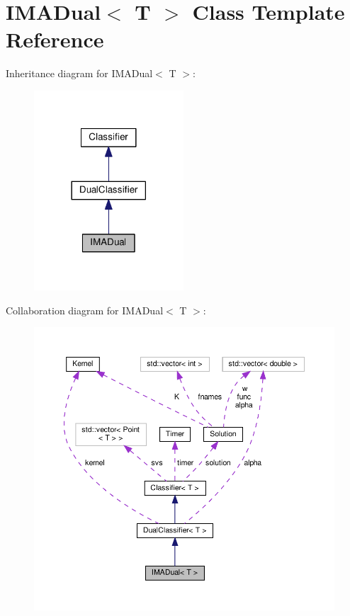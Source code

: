\hypertarget{class_i_m_a_dual}{}\section{I\+M\+A\+Dual$<$ T $>$ Class Template Reference}
\label{class_i_m_a_dual}


Inheritance diagram for I\+M\+A\+Dual$<$ T $>$\+:\nopagebreak
\begin{figure}[H]
\begin{center}
\leavevmode
\includegraphics[width=158pt]{class_i_m_a_dual__inherit__graph}
\end{center}
\end{figure}


Collaboration diagram for I\+M\+A\+Dual$<$ T $>$\+:
\nopagebreak
\begin{figure}[H]
\begin{center}
\leavevmode
\includegraphics[width=350pt]{class_i_m_a_dual__coll__graph}
\end{center}
\end{figure}
